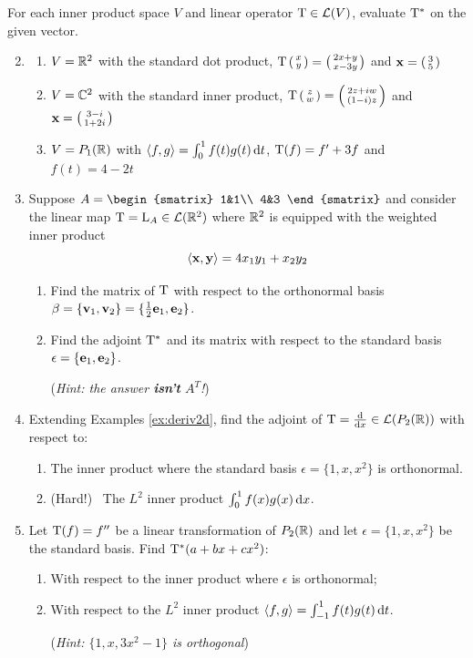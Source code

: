 \begin{exercises}
	\exstart For each inner product space $V$ and linear operator $\mathrm{T}\in\mathcal{L}(V)$, evaluate $\mathrm{T}^*$ on the given vector.
	\begin{enumerate}\setcounter{enumi}{1}
	  \item[]\begin{enumerate}
	    \item $V=\mathbb{R}^2$ with the standard dot product, $\mathrm{T}\left(\begin{smallmatrix}x\\y\end{smallmatrix}\right)=\left(\begin{smallmatrix}2x+y\\x-3y\end{smallmatrix}\right)$ and ${\mathbf{x}}=\left(\begin{smallmatrix}3\\5\end{smallmatrix}\right)$
	    \item $V=\mathbb{C}^2$ with the standard inner product, $\mathrm{T}\left(\begin{smallmatrix}z\\w\end{smallmatrix}\right)=\left(\begin{smallmatrix}2z+iw\\(1-i)z\end{smallmatrix}\right)$ and ${\mathbf{x}}=\left(\begin{smallmatrix}3-i\\1+2i\end{smallmatrix}\right)$
	    \item $V=P_1(\mathbb{R})$ with $\left\langle f,g\right\rangle=\int_0^1 f(t)g(t)\,{\mathrm{d} t}$, $\mathrm{T}(f)=f'+3f$ and $f(t)=4-2t$
	  \end{enumerate}
	  
	  
		\item Suppose $A=
		\begin{smatrix}
			1&1\\
			4&3
		\end{smatrix}$
		and consider the linear map $\mathrm{T}=\mathrm{L}_A\in\mathcal{L}(\mathbb{R}^2)$ where $\mathbb{R}^2$ is equipped with the weighted inner product
		\[
			\left\langle {\mathbf{x}},{\mathbf{y}}\right\rangle=4x_1y_1+x_2y_2
		\]
		\begin{enumerate}
		  \item Find the matrix of $\mathrm{T}$ with respect to the orthonormal basis $\beta=\{{\mathbf{v}}_1,{\mathbf{v}}_2\}=\{\frac 12{\mathbf{e}}_1,{\mathbf{e}}_2\}$.
		  \item	Find the adjoint $\mathrm{T}^*$ and its matrix with respect to the standard basis $\epsilon=\{{\mathbf{e}}_1,{\mathbf{e}}_2\}$.\par
			(\emph{Hint: the answer \textbf{isn't} $A^T$!})
		\end{enumerate}
		
		
		\item Extending Examples \ref{ex:deriv2d}, find the adjoint of $\mathrm{T}=\frac{\mathrm{d} }{\mathrm{d} x}\in\mathcal{L}(P_2(\mathbb{R}))$ with respect to:
		\begin{enumerate}
		  \item The inner product where the standard basis $\epsilon=\{1,x,x^2\}$ is orthonormal.
		  \item (Hard!) \ The $L^2$ inner product $\int_0^1f(x)g(x)\,{\mathrm{d} x}$.
		\end{enumerate}
	  
	  
	  \item Let $\mathrm{T}(f)=f''$ be a linear transformation of $P_2(\mathbb{R})$ and let $\epsilon=\{1,x,x^2\}$ be the standard basis. Find $\mathrm{T}^*(a+bx+cx^2)$:
	  \begin{enumerate}
	    \item With respect to the inner product where $\epsilon$ is orthonormal;
	    \item With respect to the $L^2$ inner product $\left\langle f,g\right\rangle=\int_{-1}^1f(t)g(t)\,{\mathrm{d} t}$.\par
	    (\emph{Hint: $\{1,x,3x^2-1\}$ is orthogonal})
	  \end{enumerate}
	  

\end{enumerate}
\end{exercises}
